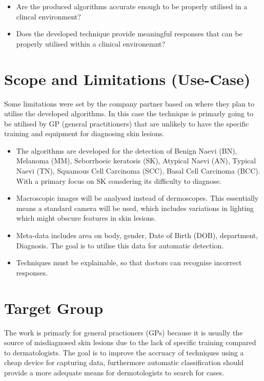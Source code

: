 \begin{itemize}
	\item Are the produced algorithms accurate enough to be properly utilised in a clincal environment?
	\item Does the developed technique provide meaningful responses that can be properly utilised within a clinical environemnt?
\end{itemize}

\section{Scope and Limitations (Use-Case)}
Some limitations were set by the company partner based on where they plan to utilise the developed algorithms. In this case the technique is primarly going to be utilised by GP (general practitioners) that are unlikely to have the specific training and equipment for diagnosing skin lesions.

\begin{itemize}
	\item The algorithms are developed for the detection of Benign Naevi (BN), Melanoma (MM), Seborrhoeic keratosis (SK), Atypical Naevi (AN), Typical Naevi (TN), Squamous Cell Carcinoma (SCC), Basal Cell Carcinoma (BCC). With a primary focus on SK consdering its difficulty to diagnose.
	\item Macroscopic images will be analysed instead of dermoscopes. This essentially means a standard camera will be used, which includes variations in lighting which might obscure features in skin lesions.
	\item Meta-data includes area on body, gender, Date of Birth (DOB), department, Diagnosis. The goal is to utilise this data for automatic detection.
	\item Techniques must be explainable, so that doctors can recognise incorrect responses.
\end{itemize}

\section{Target Group}
The work is primarly for general practioners (GPs) because it is usually the source of misdiagnosed skin lesions due to the lack of specific training compared to dermatologists. The goal is to improve the accruacy of techniques using a cheap device for capturing data, furthermore automatic classification should provide a more adequate means for dermotologists to search for cases.

